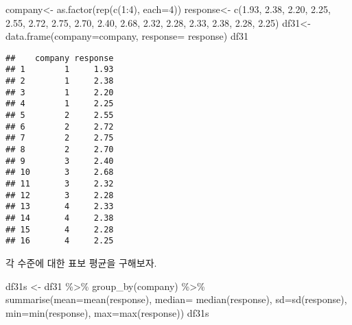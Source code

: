 \documentclass[
]{book}
\newenvironment{Shaded}{\begin{snugshade}}{\end{snugshade}}
\newcommand{\AttributeTok}[1]{\textcolor[rgb]{0.77,0.63,0.00}{#1}}
\newcommand{\DecValTok}[1]{\textcolor[rgb]{0.00,0.00,0.81}{#1}}
\newcommand{\FloatTok}[1]{\textcolor[rgb]{0.00,0.00,0.81}{#1}}
\newcommand{\FunctionTok}[1]{\textcolor[rgb]{0.00,0.00,0.00}{#1}}
\newcommand{\NormalTok}[1]{#1}
\newcommand{\OtherTok}[1]{\textcolor[rgb]{0.56,0.35,0.01}{#1}}
\newcommand{\SpecialCharTok}[1]{\textcolor[rgb]{0.00,0.00,0.00}{#1}}
\begin{document}
\begin{Shaded}
\begin{Highlighting}[]
\NormalTok{company}\OtherTok{\textless{}{-}} \FunctionTok{as.factor}\NormalTok{(}\FunctionTok{rep}\NormalTok{(}\FunctionTok{c}\NormalTok{(}\DecValTok{1}\SpecialCharTok{:}\DecValTok{4}\NormalTok{), }\AttributeTok{each=}\DecValTok{4}\NormalTok{))}
\NormalTok{response}\OtherTok{\textless{}{-}} \FunctionTok{c}\NormalTok{(}\FloatTok{1.93}\NormalTok{, }\FloatTok{2.38}\NormalTok{, }\FloatTok{2.20}\NormalTok{, }\FloatTok{2.25}\NormalTok{,}
             \FloatTok{2.55}\NormalTok{, }\FloatTok{2.72}\NormalTok{, }\FloatTok{2.75}\NormalTok{, }\FloatTok{2.70}\NormalTok{,}
             \FloatTok{2.40}\NormalTok{, }\FloatTok{2.68}\NormalTok{, }\FloatTok{2.32}\NormalTok{, }\FloatTok{2.28}\NormalTok{,}
             \FloatTok{2.33}\NormalTok{, }\FloatTok{2.38}\NormalTok{, }\FloatTok{2.28}\NormalTok{, }\FloatTok{2.25}\NormalTok{)}
\NormalTok{df31}\OtherTok{\textless{}{-}} \FunctionTok{data.frame}\NormalTok{(}\AttributeTok{company=}\NormalTok{company, }\AttributeTok{response=}\NormalTok{ response)}
\NormalTok{df31}
\end{Highlighting}
\end{Shaded}

\begin{verbatim}
##    company response
## 1        1     1.93
## 2        1     2.38
## 3        1     2.20
## 4        1     2.25
## 5        2     2.55
## 6        2     2.72
## 7        2     2.75
## 8        2     2.70
## 9        3     2.40
## 10       3     2.68
## 11       3     2.32
## 12       3     2.28
## 13       4     2.33
## 14       4     2.38
## 15       4     2.28
## 16       4     2.25
\end{verbatim}

각 수준에 대한 표보 평균을 구해보자.

\begin{Shaded}
\begin{Highlighting}[]
\NormalTok{df31s }\OtherTok{\textless{}{-}}\NormalTok{ df31 }\SpecialCharTok{\%\textgreater{}\%} \FunctionTok{group\_by}\NormalTok{(company)  }\SpecialCharTok{\%\textgreater{}\%}  \FunctionTok{summarise}\NormalTok{(}\AttributeTok{mean=}\FunctionTok{mean}\NormalTok{(response), }\AttributeTok{median=} \FunctionTok{median}\NormalTok{(response), }\AttributeTok{sd=}\FunctionTok{sd}\NormalTok{(response), }\AttributeTok{min=}\FunctionTok{min}\NormalTok{(response), }\AttributeTok{max=}\FunctionTok{max}\NormalTok{(response))}
\NormalTok{df31s}
\end{Highlighting}
\end{Shaded}
\end{document}
